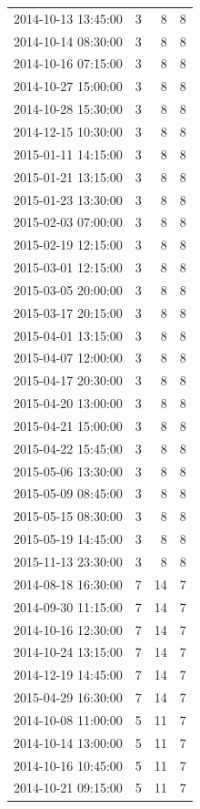 \begin{tabular}{lrrr}
2014-10-13 13:45:00 & 3 & 8 & 8 \\
2014-10-14 08:30:00 & 3 & 8 & 8 \\
2014-10-16 07:15:00 & 3 & 8 & 8 \\
2014-10-27 15:00:00 & 3 & 8 & 8 \\
2014-10-28 15:30:00 & 3 & 8 & 8 \\
2014-12-15 10:30:00 & 3 & 8 & 8 \\
2015-01-11 14:15:00 & 3 & 8 & 8 \\
2015-01-21 13:15:00 & 3 & 8 & 8 \\
2015-01-23 13:30:00 & 3 & 8 & 8 \\
2015-02-03 07:00:00 & 3 & 8 & 8 \\
2015-02-19 12:15:00 & 3 & 8 & 8 \\
2015-03-01 12:15:00 & 3 & 8 & 8 \\
2015-03-05 20:00:00 & 3 & 8 & 8 \\
2015-03-17 20:15:00 & 3 & 8 & 8 \\
2015-04-01 13:15:00 & 3 & 8 & 8 \\
2015-04-07 12:00:00 & 3 & 8 & 8 \\
2015-04-17 20:30:00 & 3 & 8 & 8 \\
2015-04-20 13:00:00 & 3 & 8 & 8 \\
2015-04-21 15:00:00 & 3 & 8 & 8 \\
2015-04-22 15:45:00 & 3 & 8 & 8 \\
2015-05-06 13:30:00 & 3 & 8 & 8 \\
2015-05-09 08:45:00 & 3 & 8 & 8 \\
2015-05-15 08:30:00 & 3 & 8 & 8 \\
2015-05-19 14:45:00 & 3 & 8 & 8 \\
2015-11-13 23:30:00 & 3 & 8 & 8 \\
2014-08-18 16:30:00 & 7 & 14 & 7 \\
2014-09-30 11:15:00 & 7 & 14 & 7 \\
2014-10-16 12:30:00 & 7 & 14 & 7 \\
2014-10-24 13:15:00 & 7 & 14 & 7 \\
2014-12-19 14:45:00 & 7 & 14 & 7 \\
2015-04-29 16:30:00 & 7 & 14 & 7 \\
2014-10-08 11:00:00 & 5 & 11 & 7 \\
2014-10-14 13:00:00 & 5 & 11 & 7 \\
2014-10-16 10:45:00 & 5 & 11 & 7 \\
2014-10-21 09:15:00 & 5 & 11 & 7 \\

\end{tabular}
